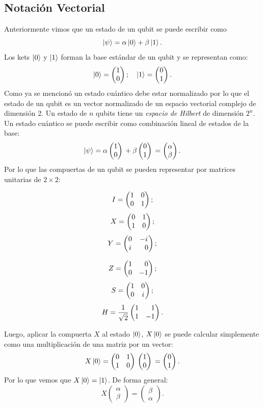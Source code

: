 \subsection{Notación Vectorial} \label{sec:matrix_notation}
Anteriormente vimos que un estado de un qubit se puede escribir como
\begin{equation}
  \ket{\psi} = \alpha\ket{0} + \beta\ket{1}.
\end{equation}
Los kets $\ket{0}$ y $\ket{1}$ forman la base estándar de un qubit y se representan como:
\setlength\multicolsep{0pt}
\begin{equation}
  \ket{0} = \begin{pmatrix}1 \\ 0\end{pmatrix}{}; \quad \ket{1} = \begin{pmatrix}0 \\ 1\end{pmatrix}{}.
\end{equation}
\noindent
Como ya se mencionó un estado cuántico debe estar normalizado por lo que el estado de un qubit es un vector normalizado de un espacio vectorial complejo de dimensión 2. Un estado de $n$ qubits tiene un \emph{espacio de Hilbert} de dimensión $2^n$.  Un estado cuántico se puede escribir como combinación lineal de estados de la base:
\begin{equation}
  \ket{\psi} = \alpha\begin{pmatrix}1 \\ 0\end{pmatrix}{} + \beta\begin{pmatrix}0 \\ 1\end{pmatrix}{} = \begin{pmatrix}\alpha \\ \beta\end{pmatrix}.
\end{equation}
Por lo que las compuertas de un qubit se pueden representar por matrices unitarias de $2 \times 2$:
\vspace*{-4mm}
\setlength\multicolsep{0pt}
\begin{multicols}{3}
  \[
    I = \begin{pmatrix} 1 & 0 \\ 0 & 1 \end{pmatrix}{};
  \]
  \vfill
  \[
    X = \begin{pmatrix} 0 & 1 \\ 1 & 0 \end{pmatrix}{};
  \]
  \vfill
  \[
    Y = \ygate{};
  \]
\end{multicols}
\begin{multicols}{3}
  \[
    Z = \zgate{};
  \]
  \vfill
  \[
    S = \begin{pmatrix} 1 & 0 \\ 0 & i \end{pmatrix}{};
  \]
  \vfill
  \[
    H = \hgate{}.
  \]
\end{multicols}
\bigskip
\noindent
Luego, aplicar la compuerta $X$ al estado $\ket{0}$, $X \ket{0}$ se puede calcular simplemente como una multiplicación de una matriz por un vector:
\begin{equation}
  X\ket{0} = \begin{pmatrix} 0 & 1 \\ 1 & 0 \end{pmatrix}{} \begin{pmatrix}1 \\ 0\end{pmatrix}{} = \begin{pmatrix}0 \\ 1\end{pmatrix}{}.
\end{equation}
Por lo que vemos que $X\ket{0} = \ket{1}$. De forma general:
\begin{equation}
  X\begin{pmatrix}\alpha \\ \beta\end{pmatrix} = \begin{pmatrix}\beta \\ \alpha\end{pmatrix}.
\end{equation}

